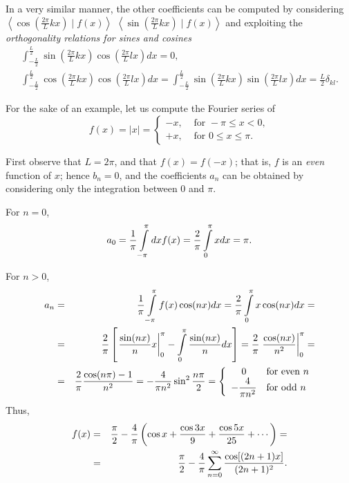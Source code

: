 {In a very similar manner, the other coefficients can be computed by considering
$\left\langle   \cos \left(\frac{2\pi }{L}kx\right)  \mid f(x) \right\rangle$
$\left\langle   \sin \left(\frac{2\pi }{L}kx\right)  \mid f(x) \right\rangle$
and exploiting the
{\em orthogonality relations for sines and cosines}
\begin{equation}
\begin{array}{l}
\int_{-\frac{L}{2}}^\frac{L}{2}
\sin\left(\frac{2\pi }{L}kx\right)
\cos\left(\frac{2\pi }{L}lx\right)
dx
=0,\\
\int_{-\frac{L}{2}}^\frac{L}{2}
\cos\left(\frac{2\pi }{L}kx\right)
\cos\left(\frac{2\pi }{L}lx\right)
dx
=
\int_{-\frac{L}{2}}^\frac{L}{2}
\sin\left(\frac{2\pi }{L}kx\right)
\sin\left(\frac{2\pi }{L}lx\right)
dx
=\frac{L}{2}\delta_{kl}.
\end{array}
\label{2012-m-ch-orsc}
\end{equation}



\eproof
}

{
\color{blue}
\bexample
For the sake of an example, let us compute the  Fourier series of
$$
f(x)=\vert x\vert
=
\begin{cases}
 -x, & \textrm{ for }  -\pi \le x<0 ,\\
 +x, & \textrm{ for }  0\le x\le \pi  .
\end{cases}
$$

First observe that $L=2\pi$, and that
$f(x)=f(-x)$; that is, $f$ is an {\em even} function of $x$;
hence
$b_n=0$, and the coefficients $a_n$ can be obtained by considering only the integration
between $0$ and $\pi$.

For $n=0$,
$$a_0={1\over\pi}\int\limits_{-\pi}^\pi dxf(x)={2\over\pi}
\int\limits_0^\pi xdx=\pi.$$

For $n>0$,
\begin{eqnarray*}
   a_n&=&{1\over\pi}\int\limits_{-\pi}^\pi f(x)\cos(nx)dx=
         {2\over\pi}\int\limits_0^\pi x\cos(nx)dx=\\
      &=&{2\over\pi}\left[\left.{\sin(nx)\over n}x\right|_0^\pi-
         \int\limits_0^\pi{\sin(nx)\over n}dx\right]={2\over\pi}\left.
         {\cos(nx)\over n^2}\right|_0^\pi=\\
      &=&{2\over\pi}{\cos(n\pi)-1\over n^2}=-{4\over\pi n^2}\sin^2{n\pi\over2}=
         \left\{\begin{array}{cl}
              0&\mbox{for even $n$}\\
              \displaystyle-{4\over\pi n^2}&\mbox{for odd $n$}
              \end{array}\right.
\end{eqnarray*}
Thus,
\begin{eqnarray*}
    f(x)&=&{\pi\over2}-{4\over\pi}\left(\cos x+
               {\cos 3x\over9}+{\cos 5x\over 25}+\cdots\right)=\\
            &=&{\pi\over2}-{4\over\pi}\sum_{n=0}^\infty
               {\cos[(2n+1)x]\over(2n+1)^2}.
\end{eqnarray*}

\eexample
}

